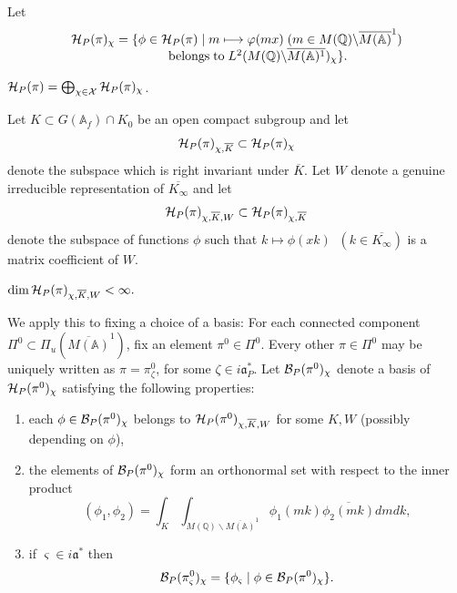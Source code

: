 Let
\[
\begin{array}{c}
{\cal H}_P(\pi )_\chi
=\{\phi \in {\cal H}_P(\pi )\;|\;m\longmapsto \varphi (mx)
\;(m\in M({\mathbb{Q}})\backslash \overline{M({\mathbb{A}})}^1) \\
{\rm \;\;\;\;\;\;\;\;\;\;\;\;belongs\;to}
\;L^2(M({\mathbb{Q}})\backslash \overline{M({\mathbb{A}})^1})_\chi \}.
\end{array}
\]

\begin{proposition}
${\cal H}_P(\pi )=\bigoplus_{\chi \in {\cal X}}{\cal H}_P(\pi )_\chi $.
\end{proposition}

Let $K\subset G({\mathbb{A}}_f)\cap K_0$ be an open compact subgroup and let 
\begin{equation}
{\cal H}_P(\pi )_{\chi ,\overline{K}}\subset {\cal H}_P(\pi )_\chi 
\end{equation}
denote the subspace which is right invariant under
$\overline{K}$. Let $W$ denote a genuine
irreducible representation of $\overline{K_\infty} $ and let 
\begin{equation}
{\cal H}_P(\pi )_{\chi ,\overline{K},W}
\subset {\cal H}_P(\pi )_{\chi ,\overline{K}}
\end{equation}
denote the subspace of functions $\phi $ such that
$k\longmapsto \phi (xk)\;\;(k\in \overline{K_\infty} )$
is a matrix coefficient of $W$.

\begin{proposition}
$\dim {\cal H}_P(\pi )_{\chi ,\overline{K},W}<\infty .$
\end{proposition}

We apply this to fixing a choice of a basis:
For each connected component $\Pi^0\subset
\Pi_u(\overline{M({\mathbb{A}})}^1)$, fix an element $\pi^0\in \Pi^0$.
Every other $\pi\in\Pi^0$ may be uniquely written as
$\pi=\pi^0_\zeta$, for some $\zeta\in i{\mathfrak{a}}^*_P$.
Let ${\cal B}_P(\pi^0 )_\chi $
denote a basis of ${\cal H}_P(\pi^0 )_\chi $ satisfying the following
properties:

\begin{enumerate}
\item  each $\phi \in {\cal B}_P(\pi^0 )_\chi $ belongs to
${\cal H}_P(\pi^0)_{\chi ,\overline{K},W}$
for some $K,W$ (possibly depending on $\phi $),

\item  the elements of ${\cal B}_P(\pi^0 )_\chi $
form an orthonormal set with
respect to the inner product
\[
(\phi _1,\phi _2)=
\int_K\int_{M({\mathbb{Q}})\backslash \overline{M({\mathbb{A}})}^1}
\phi _1(mk)\overline{\phi _2(mk)}dmdk,
\]

\item  if $\varsigma \in i{\mathfrak{a}}^{*}$ then 
\[
{\cal B}_P(\pi^0_\varsigma )_\chi =\{\phi _\varsigma \;|\;
\phi \in {\cal B}_P(\pi^0 )_\chi \}.
\]
\end{enumerate}

